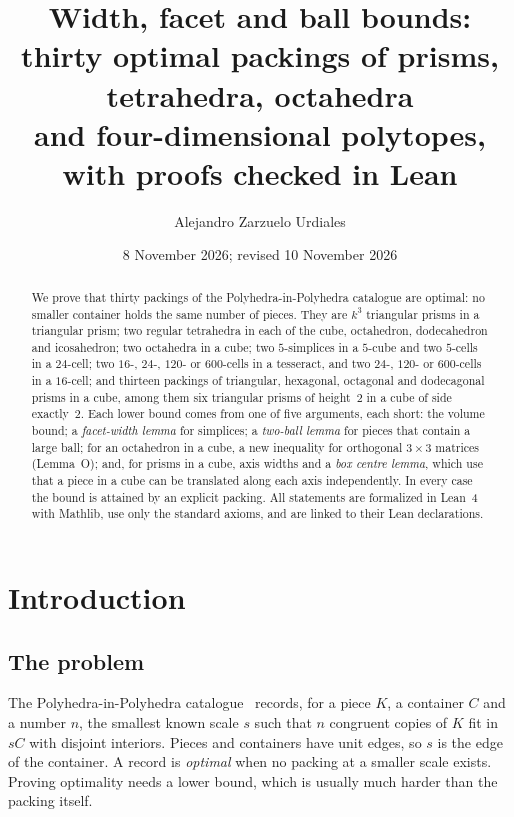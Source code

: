 \documentclass[11pt,a4paper]{article}
\title{Width, facet and ball bounds:\\
thirty optimal packings of prisms, tetrahedra, octahedra\\ and four-dimensional polytopes, with proofs checked in Lean}
\author{Alejandro Zarzuelo Urdiales}
\date{8 November 2026; revised 10 November 2026}
\begin{document}
\maketitle

\begin{abstract}
We prove that thirty packings of the Polyhedra-in-Polyhedra catalogue are optimal: no smaller container holds the same number of pieces. They are $k^3$ triangular prisms in a triangular prism; two regular tetrahedra in each of the cube, octahedron, dodecahedron and icosahedron; two octahedra in a cube; two $5$-simplices in a $5$-cube and two $5$-cells in a $24$-cell; two $16$-, $24$-, $120$- or $600$-cells in a tesseract, and two $24$-, $120$- or $600$-cells in a $16$-cell; and thirteen packings of triangular, hexagonal, octagonal and dodecagonal prisms in a cube, among them six triangular prisms of height~$2$ in a cube of side exactly~$2$. Each lower bound comes from one of five arguments, each short: the volume bound; a \emph{facet-width lemma} for simplices; a \emph{two-ball lemma} for pieces that contain a large ball; for an octahedron in a cube, a new inequality for orthogonal $3\times3$ matrices (Lemma~O); and, for prisms in a cube, axis widths and a \emph{box centre lemma}, which use that a piece in a cube can be translated along each axis independently. In every case the bound is attained by an explicit packing. All statements are formalized in Lean~4 with Mathlib, use only the standard axioms, and are linked to their Lean declarations.
\end{abstract}

\tableofcontents

\section{Introduction}\label{sec:intro}

\subsection{The problem}
The Polyhedra-in-Polyhedra catalogue~\cite{archive} records, for a piece $K$, a container $C$ and a number $n$, the smallest known scale $s$ such that $n$ congruent copies of $K$ fit in $sC$ with disjoint interiors. Pieces and containers have unit edges, so $s$ is the edge of the container. A record is \emph{optimal} when no packing at a smaller scale exists. Proving optimality needs a lower bound, which is usually much harder than the packing itself.
\end{document}
